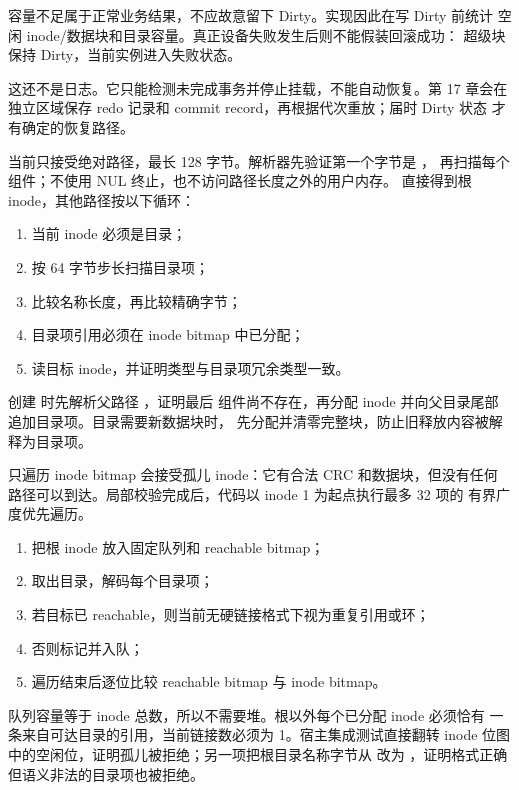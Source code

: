 容量不足属于正常业务结果，不应故意留下 Dirty。实现因此在写 Dirty 前统计
空闲 inode/数据块和目录容量。真正设备失败发生后则不能假装回滚成功：
超级块保持 Dirty，当前实例进入失败状态。

这还不是日志。它只能检测未完成事务并停止挂载，不能自动恢复。第 17 章会在
独立区域保存 redo 记录和 commit record，再根据代次重放；届时 Dirty 状态
才有确定的恢复路径。

当前只接受绝对路径，最长 128 字节。解析器先验证第一个字节是 \code{/}，
再扫描每个组件；不使用 NUL 终止，也不访问路径长度之外的用户内存。
\code{/} 直接得到根 inode，其他路径按以下循环：

\begin{enumerate}[label=\arabic*.]
  \item 当前 inode 必须是目录；
  \item 按 64 字节步长扫描目录项；
  \item 比较名称长度，再比较精确字节；
  \item 目录项引用必须在 inode bitmap 中已分配；
  \item 读目标 inode，并证明类型与目录项冗余类型一致。
\end{enumerate}

创建  时先解析父路径 ，证明最后
组件尚不存在，再分配 inode 并向父目录尾部追加目录项。目录需要新数据块时，
先分配并清零完整块，防止旧释放内容被解释为目录项。

只遍历 inode bitmap 会接受孤儿 inode：它有合法 CRC 和数据块，但没有任何
路径可以到达。局部校验完成后，代码以 inode 1 为起点执行最多 32 项的
有界广度优先遍历。

\begin{enumerate}[label=\arabic*.]
  \item 把根 inode 放入固定队列和 reachable bitmap；
  \item 取出目录，解码每个目录项；
  \item 若目标已 reachable，则当前无硬链接格式下视为重复引用或环；
  \item 否则标记并入队；
  \item 遍历结束后逐位比较 reachable bitmap 与 inode bitmap。
\end{enumerate}

队列容量等于 inode 总数，所以不需要堆。根以外每个已分配 inode 必须恰有
一条来自可达目录的引用，当前链接数必须为 1。宿主集成测试直接翻转 inode
位图中的空闲位，证明孤儿被拒绝；另一项把根目录名称字节从  改为
，证明格式正确但语义非法的目录项也被拒绝。

